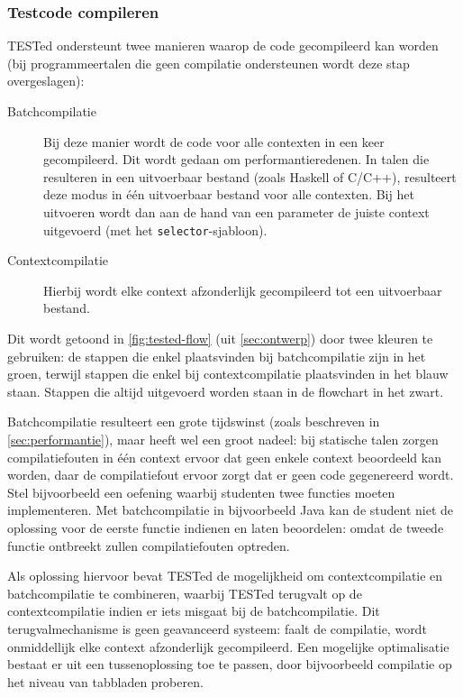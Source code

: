 \subsubsection{Testcode compileren}

TESTed ondersteunt twee manieren waarop de code gecompileerd kan worden (bij programmeertalen die geen compilatie ondersteunen wordt deze stap overgeslagen):

\begin{description}
    \item[Batchcompilatie] Bij deze manier wordt de code voor alle contexten in een keer gecompileerd.
    Dit wordt gedaan om performantieredenen.
    In talen die resulteren in een uitvoerbaar bestand (zoals Haskell of C/C++), resulteert deze modus in één uitvoerbaar bestand voor alle contexten.
    Bij het uitvoeren wordt dan aan de hand van een parameter de juiste context uitgevoerd (met het \texttt{selector}-sjabloon).
    \item[Contextcompilatie] Hierbij wordt elke context afzonderlijk gecompileerd tot een uitvoerbaar bestand.
\end{description}

Dit wordt getoond in \cref{fig:tested-flow} (uit \cref{sec:ontwerp}) door twee kleuren te gebruiken: de stappen die enkel plaatsvinden bij batchcompilatie zijn in het \textcolor{ugent-ps}{groen}, terwijl stappen die enkel bij contextcompilatie plaatsvinden in het \textcolor{ugent-we}{blauw} staan.
Stappen die altijd uitgevoerd worden staan in de flowchart in het zwart.

Batchcompilatie resulteert een grote tijdswinst (zoals beschreven in \cref{sec:performantie}), maar heeft wel een groot nadeel: bij statische talen zorgen compilatiefouten in één context ervoor dat geen enkele context beoordeeld kan worden, daar de compilatiefout ervoor zorgt dat er geen code gegenereerd wordt.
Stel bijvoorbeeld een oefening waarbij studenten twee functies moeten implementeren.
Met batchcompilatie in bijvoorbeeld Java kan de student niet de oplossing voor de eerste functie indienen en laten beoordelen: omdat de tweede functie ontbreekt zullen compilatiefouten optreden.

Als oplossing hiervoor bevat TESTed de mogelijkheid om contextcompilatie en batchcompilatie te combineren, waarbij TESTed terugvalt op de contextcompilatie indien er iets misgaat bij de batchcompilatie.
Dit terugvalmechanisme is geen geavanceerd systeem: faalt de compilatie, wordt onmiddellijk elke context afzonderlijk gecompileerd.
Een mogelijke optimalisatie bestaat er uit een tussenoplossing toe te passen, door bijvoorbeeld compilatie op het niveau van tabbladen proberen.

